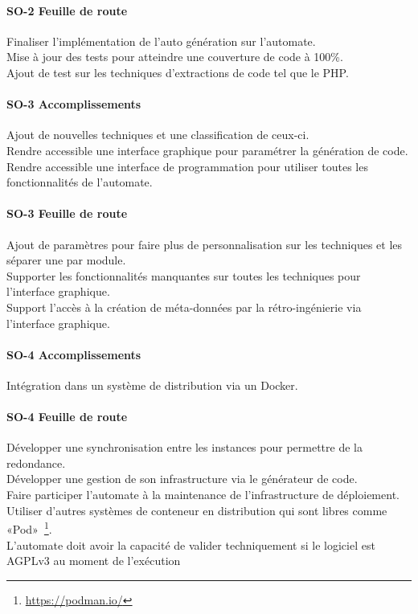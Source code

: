 \paragraph{SO-2 Feuille de route}
Finaliser l’implémentation de l'auto génération sur l’automate.\\
Mise à jour des tests pour atteindre une couverture de code à 100\%.\\
Ajout de test sur les techniques d’extractions de code tel que le PHP.

\paragraph{SO-3 Accomplissements}
Ajout de nouvelles techniques et une classification de ceux-ci.\\
Rendre accessible une interface graphique pour paramétrer la génération de code.\\
Rendre accessible une interface de programmation pour utiliser toutes les fonctionnalités de l’automate.

\paragraph{SO-3 Feuille de route}
Ajout de paramètres pour faire plus de personnalisation sur les techniques et les séparer une par module.\\
Supporter les fonctionnalités manquantes sur toutes les techniques pour l’interface graphique.\\
Support l’accès à la création de méta-données par la rétro-ingénierie via l’interface graphique.

\paragraph{SO-4 Accomplissements}
Intégration dans un système de distribution via un Docker.

\paragraph{SO-4 Feuille de route}
Développer une synchronisation entre les instances pour permettre de la redondance.\\
Développer une gestion de son infrastructure via le générateur de code.\\
Faire participer l’automate à la maintenance de l’infrastructure de déploiement.\\
Utiliser d’autres systèmes de conteneur en distribution qui sont libres comme «Pod»~\footnote{\url{https://podman.io/}}.\\
L’automate doit avoir la capacité de valider techniquement si le logiciel est AGPLv3 au moment de l’exécution


